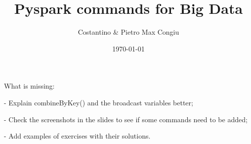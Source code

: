 \documentclass[12pt]{article}
\title{Pyspark commands for Big Data}
\author{Costantino \& Pietro Max Congiu}
\date{\today}
\begin{document}
\maketitle


What is missing:

- Explain combineByKey() and the broadcast variables better;

- Check the screenshots in the slides to see if some commands need to be added;

- Add examples of exercises with their solutions.

\tableofcontents

\newpage













\newpage


\end{document}
